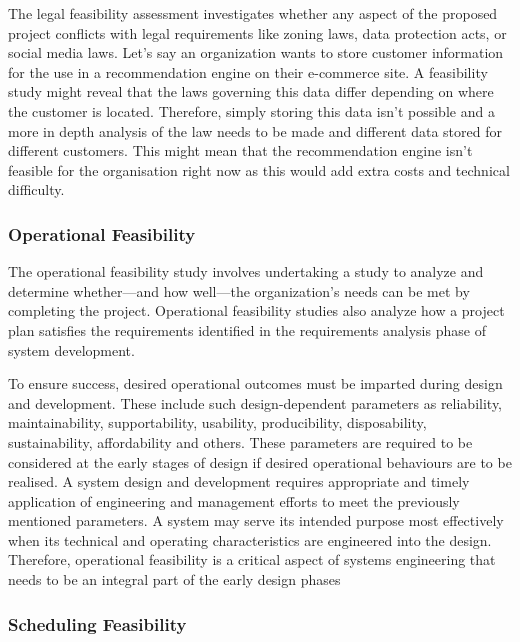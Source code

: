 \documentclass[
]{book}
\begin{document}
The legal feasibility assessment investigates whether any aspect of the proposed project conflicts with legal requirements like zoning laws, data protection acts, or social media laws. Let's say an organization wants to store customer information for the use in a recommendation engine on their e-commerce site. A feasibility study might reveal that the laws governing this data differ depending on where the customer is located. Therefore, simply storing this data isn't possible and a more in depth analysis of the law needs to be made and different data stored for different customers. This might mean that the recommendation engine isn't feasible for the organisation right now as this would add extra costs and technical difficulty.

\hypertarget{operational-feasibility}{%
\subsubsection{Operational Feasibility}\label{operational-feasibility}}

The operational feasibility study involves undertaking a study to analyze and determine whether---and how well---the organization's needs can be met by completing the project. Operational feasibility studies also analyze how a project plan satisfies the requirements identified in the requirements analysis phase of system development.

To ensure success, desired operational outcomes must be imparted during design and development. These include such design-dependent parameters as reliability, maintainability, supportability, usability, producibility, disposability, sustainability, affordability and others. These parameters are required to be considered at the early stages of design if desired operational behaviours are to be realised. A system design and development requires appropriate and timely application of engineering and management efforts to meet the previously mentioned parameters. A system may serve its intended purpose most effectively when its technical and operating characteristics are engineered into the design. Therefore, operational feasibility is a critical aspect of systems engineering that needs to be an integral part of the early design phases

\hypertarget{scheduling-feasibility}{%
\subsubsection{Scheduling Feasibility}\label{scheduling-feasibility}}
\end{document}

